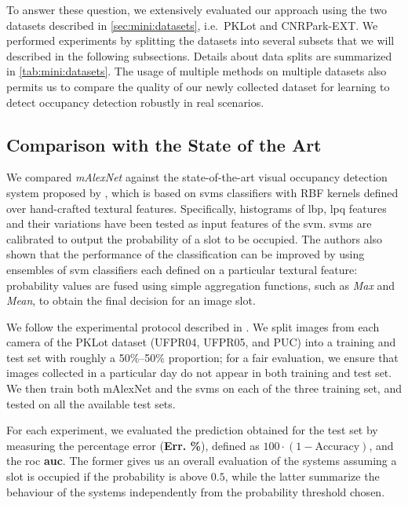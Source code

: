 To answer these question, we extensively evaluated our approach using the two datasets described in \ref{sec:mini:datasets}, i.e.\ PKLot and CNRPark-EXT.
We performed experiments by splitting the datasets into several subsets that we will described in the following subsections.
Details about data splits are summarized in \ref{tab:mini:datasets}.
The usage of multiple methods on multiple datasets also permits us to compare the quality of our newly collected dataset for learning to detect occupancy detection robustly in real scenarios.


\subsection{Comparison with the State of the Art}
\label{sub:mini:sota}

We compared \emph{mAlexNet} against the state-of-the-art visual occupancy detection system proposed by \citet{de2015pklot}, which is based on \glspl{svm} classifiers with RBF kernels defined over hand-crafted textural features.
Specifically, histograms of \gls{lbp}, \gls{lpq} features and their variations \cite{ojala2002multiresolution, ojansivu2008blur, rahtu2012local} have been tested as input features of the \gls{svm}.
\Glspl{svm} are calibrated to output the probability of a slot to be occupied.
The authors also shown that the performance of the classification can be improved by using ensembles of \gls{svm} classifiers each defined on a particular textural feature:
probability values are fused using simple aggregation functions, such as \emph{Max} and \emph{Mean}, to obtain the final decision for an image slot.

We follow the experimental protocol described in \cite{de2015pklot}.
We split images from each camera of the PKLot dataset (UFPR04, UFPR05, and PUC) into a training and test set with roughly a 50\%--50\% proportion;
for a fair evaluation, we ensure that images collected in a particular day do not appear in both training and test set.
We then train both mAlexNet and the \glspl{svm} on each of the three training set, and tested on all the available test sets.
%

For each experiment, we evaluated the prediction obtained for the test set by measuring the percentage error (\textbf{Err. \%}), defined as $100 \cdot (1 - \text{Accuracy})$, and the \gls{roc} \textbf{\gls{auc}}.
The former gives us an overall evaluation of the systems assuming a slot is occupied if the probability is above $0.5$, while the latter summarize the behaviour of the systems independently from the probability threshold chosen.


